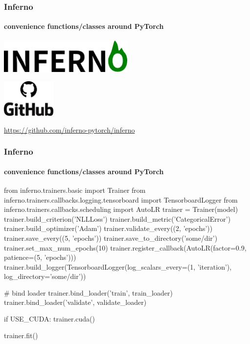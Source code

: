\documentclass{beamer}
\begin{document}
\begin{frame}
\frametitle{Inferno}
\framesubtitle{convenience functions/classes around PyTorch}

\begin{center}
\includegraphics[width=0.5\textwidth]{inferno.pdf}
\end{center}
\vspace{1cm}
\begin{center}
\includegraphics[width=0.2\textwidth]{g.pdf}
\end{center}
\begin{center}
\url{https://github.com/inferno-pytorch/inferno}
\end{center}
\end{frame}


\begin{frame}[fragile ]
\frametitle{Inferno}
\framesubtitle{convenience functions/classes around PyTorch}

\begin{pythoncode}
from inferno.trainers.basic import Trainer
from inferno.trainers.callbacks.logging.tensorboard import TensorboardLogger
from inferno.trainers.callbacks.scheduling import AutoLR
trainer = Trainer(model)
trainer.build_criterion('NLLLoss')
trainer.build_metric('CategoricalError')
trainer.build_optimizer('Adam')
trainer.validate_every((2, 'epochs'))
trainer.save_every((5, 'epochs'))
trainer.save_to_directory('some/dir')
trainer.set_max_num_epochs(10)
trainer.register_callback(AutoLR(factor=0.9, patience=(5, 'epochs')))
trainer.build_logger(TensorboardLogger(log_scalars_every=(1, 'iteration'),
                log_directory='some/dir'))

# bind loader 
trainer.bind_loader('train', train_loader) 
trainer.bind_loader('validate', validate_loader)

if USE_CUDA:
  trainer.cuda()

trainer.fit()
\end{pythoncode}
\end{frame}
\end{document}
